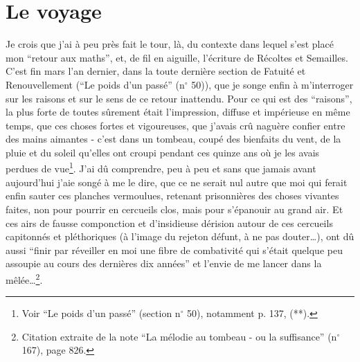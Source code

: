 \section{Le voyage}

Je crois que j'ai à peu près fait le tour, là, du contexte dans lequel s'est placé mon ``retour aux maths'', et, de fil en aiguille, l'écriture de Récoltes et Semailles. C'est fin mars l'an dernier, dans la toute dernière section de Fatuité et Renouvellement (``Le poids d'un passé'' (n$^{\circ}$ 50)), que je songe enfin à m'interroger sur les raisons et sur le sens de ce retour inattendu. Pour ce qui est des ``raisons'', la plus forte de toutes sûrement était l'impression, diffuse et impérieuse en même temps, que ces choses fortes et vigoureuses, que j'avais crû naguère confier entre des mains aimantes - c'est dans un tombeau, coupé des bienfaits du vent, de la pluie et du soleil qu'elles ont croupi pendant ces quinze ans où je les avais perdues de vue\footnote{Voir ``Le poids d'un passé'' (section n$^{\circ}$ 50), notamment p. 137, (**).}. J'ai dû comprendre, peu à peu et sans que jamais avant aujourd'hui j'aie songé à me le dire, que ce ne serait nul autre que moi qui ferait enfin sauter ces planches vermoulues, retenant prisonnières des choses vivantes faites, non pour pourrir en cercueils clos, mais pour s'épanouir au grand air. Et ces airs de fausse componction et d'insidieuse dérision autour de ces cercueils capitonnés et pléthoriques (à l'image du rejeton défunt, à ne pas douter\ldots), ont dû aussi ``finir par réveiller en moi une fibre de combativité qui s'était quelque peu assoupie au cours des dernières dix années'' et l'envie de me lancer dans la mêlée\ldots\footnote{Citation extraite de la note ``La mélodie au tombeau - ou la suffisance'' (n$^{\circ}$ 167), page 826.}.

